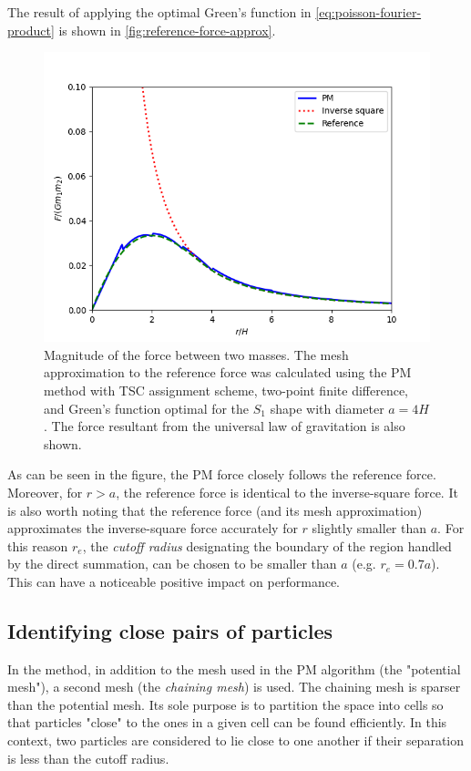 The result of applying the optimal Green's function in \autoref{eq:poisson-fourier-product} is shown in \autoref{fig:reference-force-approx}.
\begin{figure}[htp]
    \centering
    \includegraphics[scale=0.6]{img/optimal-green-force-4.png}
    \caption{Magnitude of the force between two masses.
        The mesh approximation to the reference force was calculated using the PM method with TSC assignment scheme, two-point finite difference, and Green's function optimal for the $S_1$ shape with diameter $a=4H$.
        The force resultant from the universal law of gravitation is also shown.}
    \label{fig:reference-force-approx}
\end{figure}
As can be seen in the figure, the PM force closely follows the reference force.
Moreover, for $r>a$, the reference force is identical to the inverse-square force.
It is also worth noting that the reference force (and its mesh approximation) approximates the inverse-square force accurately for $r$ slightly smaller than $a$.
For this reason $r_e$, the \textit{cutoff radius} designating the boundary of the region handled by the direct summation, can be chosen to be smaller than $a$ (e.g. $r_e = 0.7a$).
This can have a noticeable positive impact on performance.

\subsection{Identifying close pairs of particles}
In the \PThreeM{} method, in addition to the mesh used in the PM algorithm (the "potential mesh"), a second mesh (the \textit{chaining mesh}) is used.
The chaining mesh is sparser than the potential mesh.
Its sole purpose is to partition the space into cells so that particles "close" to the ones in a given cell can be found efficiently.
In this context, two particles are considered to lie close to one another if their separation is less than the cutoff radius.


